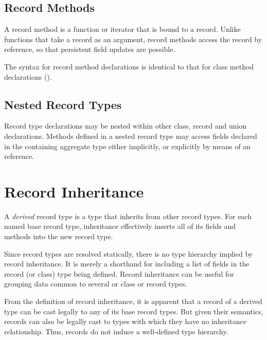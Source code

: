 \subsection{Record Methods}
\label{Record_Methods}

A record method is a function or iterator that is bound to a record.  Unlike
functions that take a record as an argument, record methods access the record by
reference, so that persistent field updates are possible.

The syntax for record method declarations is identical to that for class method
declarations ().

\subsection{Nested Record Types}
\label{Nested_Record_Types}

Record type declarations may be nested within other class, record and union
declarations.  Methods defined in a nested record type may access fields
declared in the containing aggregate type either implicitly, or explicitly by
means of an  reference.

\section{Record Inheritance}
\label{Record_Inheritance}

A \emph{derived} record type is a type that inherits from other record types.  For each named
base record type, inheritance effectively inserts all of its fields and methods
into the new record type.

Since record types are resolved statically, there is no type hierarchy implied
by record inheritance.  It is merely a shorthand for including a list of fields
in the record (or class) type being defined.  Record inheritance can be useful
for grouping data common to several or class or record types.

\begin{future}
From the definition of record inheritance, it is apparent that a record of a
derived type can be cast legally to any of its base record types.  But given
their semantics, records can also be legally cast to types with which they have
no inheritance relationship.  Thus, records do not induce a well-defined type
hierarchy.
\end{future}


